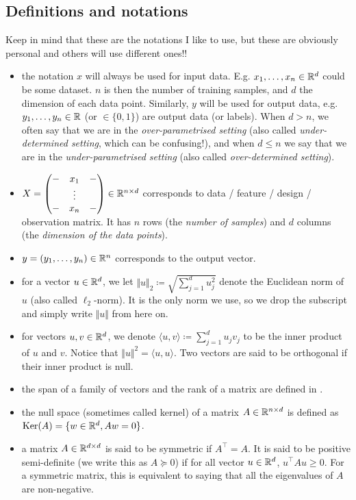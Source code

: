 \subsection{Definitions and notations}
\label{subsec:notations}

Keep in mind that these are the notations I like to use, but these are obviously personal and others will use different ones!!
\begin{itemize}
    \item the notation $x$ will always be used for input data. E.g. $x_1, \dots, x_n \in \mathbb{R}^d$ could be some dataset. $n$ is then the number of training samples, and $d$ the dimension of each data point. Similarly, $y$ will be used for output data, e.g. $y_1, \dots, y_n \in \mathbb{R}$ (or $\in \{0, 1\}$) are output data (or labels). When $d > n$, we often say that we are in the \textit{over-parametrised setting} (also called \textit{under-determined setting}, which can be confusing!), and when $d \leq n$ we say that we are in the \textit{under-parametrised setting} (also called \textit{over-determined setting}).
    \item $X = \begin{pmatrix}
- & x_1 & - \\
  & \vdots &  \\
- & x_n & -
\end{pmatrix}
\in \mathbb{R}^{n \times d}$ corresponds to data / feature / design / observation matrix. It has $n$ rows (the \textit{number of samples}) and $d$ columns (the \textit{dimension of the data points}).
    \item $y = (y_1, \dots, y_n) \in \mathbb{R}^{n}$ corresponds to the output vector.
    \item for a vector $u \in \mathbb{R}^d$, we let $\Vert u \Vert_2 \coloneqq \sqrt{\sum_{j = 1}^d u_j^2}$ denote the Euclidean norm of $u$ (also called $\ell_2$-norm). It is the only norm we use, so we drop the subscript and simply write $\Vert u \Vert$ from here on.
    \item for vectors $u, v \in \mathbb{R}^d$, we denote $\langle u, v \rangle \coloneqq \sum_{j = 1}^d u_j v_j$ to be the inner product of $u$ and $v$. Notice that $\Vert u \Vert^2 = \langle u, u \rangle$. Two vectors are said to be orthogonal if their inner product is null.
    \item the span of a family of vectors and the rank of a matrix are defined in .
    \item the null space (sometimes called kernel) of a matrix $A \in \mathbb{R}^{n \times d}$ is defined as $\mathrm{Ker}(A) = \{ w \in \mathbb{R}^d, A w = 0 \}$.
    \item a matrix $A \in \mathbb{R}^{d \times d}$ is said to be symmetric if $A^{\top} = A$. It is said to be positive semi-definite (we write this as  $A \succeq 0$) if for all vector $u \in \mathbb{R}^d$, $u^\top A u \geq 0$. For a symmetric matrix, this is equivalent to saying that all the eigenvalues of $A$ are non-negative.
\end{itemize}



